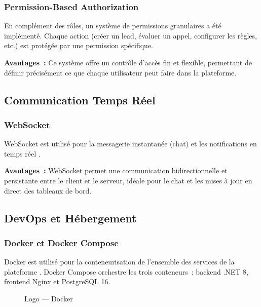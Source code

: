 \subsubsection{Permission-Based Authorization}

\noindent En complément des rôles, un système de permissions granulaires a été implémenté.
Chaque action (créer un lead, évaluer un appel, configurer les règles, etc.) est protégée
par une permission spécifique.

\textbf{Avantages~:} Ce système offre un contrôle d'accès fin et flexible, permettant de
définir précisément ce que chaque utilisateur peut faire dans la plateforme.

\subsection{Communication Temps Réel}

\subsubsection{WebSocket}

\noindent WebSocket est utilisé pour la messagerie instantanée (chat) et les notifications
en temps réel \cite{WebSocket}.

\textbf{Avantages~:} WebSocket permet une communication bidirectionnelle et persistante
entre le client et le serveur, idéale pour le chat et les mises à jour en direct des
tableaux de bord.

\subsection{DevOps et Hébergement}

\subsubsection{Docker et Docker Compose}

\noindent Docker est utilisé pour la conteneurisation de l'ensemble des services de la
plateforme \cite{Docker}. Docker Compose orchestre les trois conteneurs~: backend .NET 8,
frontend Nginx et PostgreSQL 16.

\begin{figure}[H]
    \centering
    \caption{Logo --- Docker}
    \label{fig:logo_docker}
\end{figure}

